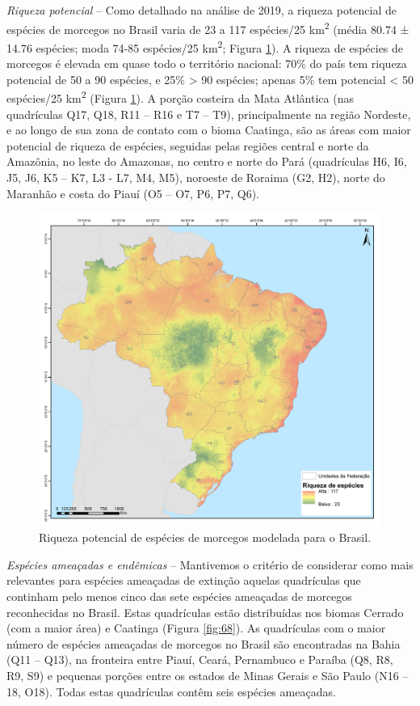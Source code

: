 \documentclass[
  oneside]{scrbook}
\begin{document}
\emph{Riqueza potencial} -- Como detalhado na análise de 2019, a riqueza potencial de espécies de morcegos no Brasil varia de 23 a 117 espécies/25 km\textsuperscript{2} (média 80.74 ± 14.76 espécies; moda 74-85 espécies/25 km\textsuperscript{2}; Figura \ref{fig:67}). A riqueza de espécies de morcegos é elevada em quase todo o território nacional: 70\% do país tem riqueza potencial de 50 a 90 espécies, e 25\% \textgreater{} 90 espécies; apenas 5\% tem potencial \textless{} 50 espécies/25 km\textsuperscript{2} (Figura \ref{fig:67}). A porção costeira da Mata Atlântica (nas quadrículas Q17, Q18, R11 -- R16 e T7 -- T9), principalmente na região Nordeste, e ao longo de sua zona de contato com o bioma Caatinga, são as áreas com maior potencial de riqueza de espécies, seguidas pelas regiões central e norte da Amazônia, no leste do Amazonas, no centro e norte do Pará (quadrículas H6, I6, J5, J6, K5 -- K7, L3 - L7, M4, M5), noroeste de Roraima (G2, H2), norte do Maranhão e costa do Piauí (O5 -- O7, P6, P7, Q6).

\begin{figure}[H]

{\centering \includegraphics[width=0.75\linewidth]{imagens/cap09/Figura_9.1} 

}

\caption{Riqueza potencial de espécies de morcegos modelada para o Brasil.}\label{fig:67}
\end{figure}

\emph{Espécies ameaçadas e endêmicas} -- Mantivemos o critério de considerar como mais relevantes para espécies ameaçadas de extinção aquelas quadrículas que continham pelo menos cinco das sete espécies ameaçadas de morcegos reconhecidas no Brasil. Estas quadrículas estão distribuídas nos biomas Cerrado (com a maior área) e Caatinga (Figura \ref{fig:68}). As quadrículas com o maior número de espécies ameaçadas de morcegos no Brasil são encontradas na Bahia (Q11 -- Q13), na fronteira entre Piauí, Ceará, Pernambuco e Paraíba (Q8, R8, R9, S9) e pequenas porções entre os estados de Minas Gerais e São Paulo (N16 -- 18, O18). Todas estas quadrículas contêm seis espécies ameaçadas.
\end{document}
